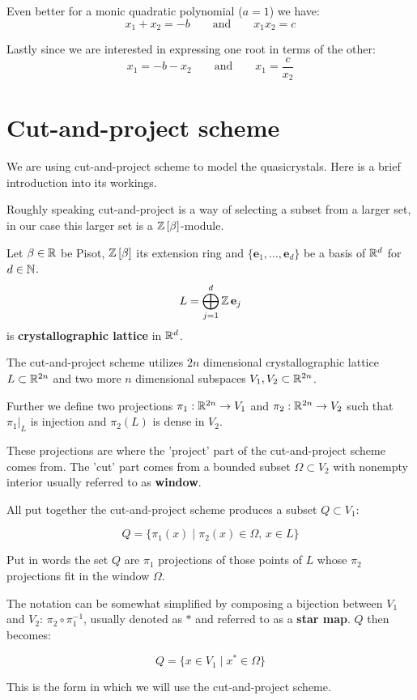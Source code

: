 \documentclass[text.tex]{subfiles}
\begin{document}
Even better for a monic quadratic polynomial ($a=1$) we have:
$$x_1+x_2=-b\qquad\text{and}\qquad x_1x_2=c$$

Lastly since we are interested in expressing one root in terms of the other: 
$$x_1=-b-x_2\qquad\text{and}\qquad x_1=\frac{c}{x_2}$$

\section{Cut-and-project scheme}\label{sec_cutAndProject}%
We are using cut-and-project scheme to model the quasicrystals. Here is a brief introduction into its workings. 

Roughly speaking cut-and-project is a way of selecting a subset from a larger set, in our case this larger set is a $\mathbb{Z}\left[\beta\right]$-module. 

\begin{definition}
Let $\beta\in\mathbb{R}$ be Pisot, $\mathbb{Z}\left[\beta\right]$ its extension ring and $\{\mathbf{e}_1, \dots, \mathbf{e}_d\}$ be a basis of $\mathbb{R}^d$ for $d\in\mathbb{N}$. 
$$L = \bigoplus^d_{j=1}\mathbb{Z}\, \mathbf{e}_j$$
is \textbf{crystallographic lattice} in $\mathbb{R}^d$.
\end{definition} 

The cut-and-project scheme utilizes $2n$ dimensional crystallographic lattice $L\subset\mathbb{R}^{2n}$ and two more $n$ dimensional subspaces $V_1, V_2\subset\mathbb{R}^{2n}$. 

Further we define two projections $\pi_1:\mathbb{R}^{2n}\rightarrow V_1$ and $\pi_2:\mathbb{R}^{2n}\rightarrow V_2$ such that $\pi_1|_L$ is injection and $\pi_2(L)$ is dense in $V_2$. 

These projections are where the 'project' part of the cut-and-project scheme comes from. The 'cut' part comes from a bounded subset $\Omega\subset V_2$ with nonempty interior usually referred to as \textbf{window}. 

All put together the cut-and-project scheme produces a subset $Q\subset V_1$:

$$Q = \{ \pi_1(x)\; |\; \pi_2(x)\in \Omega,\,  x\in L \}$$

Put in words the set $Q$ are $\pi_1$ projections of those points of $L$ whose $\pi_2$ projections fit in the window $\Omega$. 

The notation can be somewhat simplified by composing a bijection between $V_1$ and $V_2$: $\pi_2\circ\pi^{-1}_1$, usually denoted as $\ast$ and referred to as a \textbf{star map}. $Q$ then becomes:

$$Q = \{ x \in V_1\; |\; x^\ast\in \Omega \}$$

This is the form in which we will use the cut-and-project scheme. 
\end{document}
